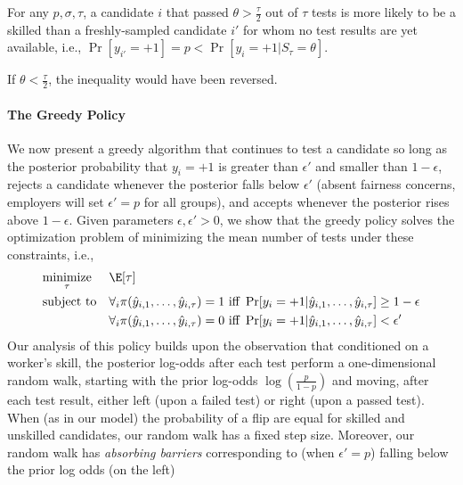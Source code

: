 \begin{theorem}\label{thm:posteriorBetter}
For any $p,\sigma, \tau$, a candidate $i$ 
that passed $\theta>\frac{\tau}{2}$ out of $\tau$ tests 
is more likely to be a skilled
than a freshly-sampled candidate $i'$ 
for whom no test results are yet available, i.e.,
$\Pr[y_{i'}=+1]=p<\Pr[y_i=+1|S_{\tau}=\theta]$.
\end{theorem}
\begin{remark}
If $\theta<\frac{\tau}{2}$, the inequality would have been reversed.
\end{remark}


\paragraph*{The Greedy Policy}
% 
We now present a greedy algorithm 
that continues to test a candidate 
so long as the posterior probability that $y_i=+1$ 
is greater than $\epsilon'$ and smaller than $1-\epsilon$,
rejects a candidate whenever the posterior falls below $\epsilon'$
(absent fairness concerns, employers will set $\epsilon'=p$ for all groups), 
and accepts whenever the posterior rises above $1-\epsilon$. 
Given parameters $\epsilon,\epsilon'>0$, 
we show that the greedy policy solves the optimization problem 
of minimizing the mean number of tests under these constraints, i.e.,
\begin{equation*}
\begin{aligned}
& \underset{\tau}{\text{minimize}}
& & \E[\tau] \\
& \text{subject to}
& &\forall_i \pi(\hat{y}_{i,1},\dots,\hat{y}_{i,\tau}) =1 \text{ iff } \Pr[y_i=+1|\hat{y}_{i,1},\dots,\hat{y}_{i,\tau}]\geq 1-\epsilon\\
& & & \forall_i \pi(\hat{y}_{i,1},\dots,\hat{y}_{i,\tau}) =0 \text{ iff } \Pr[y_i=+1|\hat{y}_{i,1},\dots,\hat{y}_{i,\tau}]<\epsilon'
\end{aligned}
\end{equation*}
Our analysis of this policy builds upon the observation
that conditioned on a worker's skill,  
the posterior log-odds after each test
perform a one-dimensional random walk,
starting with the prior log-odds $\log(\frac{p}{1-p})$
and moving, after each test result, either left 
(upon a failed test) or right (upon a passed test).  
When (as in our model) the probability of a flip 
are equal for skilled and unskilled candidates, 
our random walk has a fixed step size.
Moreover, our random walk has \emph{absorbing barriers}
corresponding to (when $\epsilon'=p$) 
falling below the prior log odds (on the left)
